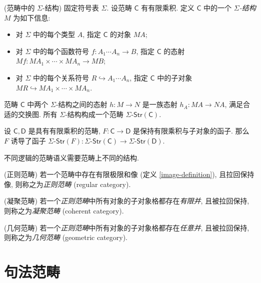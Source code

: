 \begin{definition}
	{(范畴中的 $\Sigma$-结构)}
	固定符号表 $\Sigma$. 设范畴 $\mathsf C$ 有有限乘积.
	定义 $\mathsf C$ 中的一个 \emph{$\Sigma$-结构} $M$ 为如下信息:
	\begin{itemize}
		\item 对 $\Sigma$ 中的每个类型 $A$, 指定 $\mathsf C$ 的对象 $MA$;
		\item 对 $\Sigma$ 中的每个函数符号 $f\colon A_1\cdots A_n \to B$, 指定 $\mathsf C$ 的态射
		$Mf \colon MA_1\times\cdots\times MA_n \to MB$;
		\item 对 $\Sigma$ 中的每个关系符号 $R \hookrightarrow A_1\cdots A_n$, 指定 $\mathsf C$ 中的子对象
		$MR \hookrightarrow MA_1\times\cdots\times MA_n$.
	\end{itemize}
	
	范畴 $\mathsf C$ 中两个 $\Sigma$-结构之间的态射 $h\colon M\to N$ 是一族态射 $h_A \colon MA \to NA$, 满足合适的交换图. 所有 $\Sigma$-结构构成一个范畴 $\Sigma\text{-}\mathsf{Str}(\mathsf C)$.
\end{definition}

\begin{prop}
	{}
	设 $\mathsf C,\mathsf D$ 是具有有限乘积的范畴,
	$F \colon \mathsf C \to \mathsf D$ 是保持有限乘积与子对象的函子. 那么 $F$ 诱导了函子
	$\Sigma\text{-}\mathsf{Str}(F)\colon \Sigma\text{-}\mathsf{Str}(\mathsf C) \to \Sigma\text{-}\mathsf{Str}(\mathsf D)$.
\end{prop}

不同逻辑的范畴语义需要范畴上不同的结构.

\begin{definition}
	{(正则范畴)}
	若一个范畴中存在有限极限和像 (定义 \ref{image-definition}), 且拉回保持像, 则称之为\emph{正则范畴} (regular category).
\end{definition}

\begin{definition}
	{(凝聚范畴)}
	若一个\emph{正则范畴}中所有对象的子对象格都存在\emph{有限并}, 且被拉回保持, 则称之为\emph{凝聚范畴} (coherent category).
\end{definition}

\begin{definition}
	{(几何范畴)}
	若一个\emph{正则范畴}中所有对象的子对象格都存在\emph{任意并}, 且被拉回保持, 则称之为\emph{几何范畴} (geometric category).
\end{definition}

\section{句法范畴}

